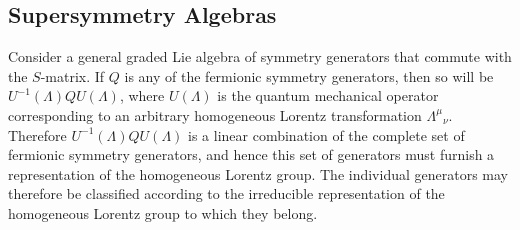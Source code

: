\subsection{Supersymmetry Algebras}

\newcommand{\WeylQ}{\mathrm{Q}}

Consider a general graded Lie algebra of symmetry generators that commute
with the \(S\)-matrix. If \(Q\) is any of the fermionic symmetry generators,
then so will be \(U^{-1}(\Lambda)QU(\Lambda)\), where \(U(\Lambda)\) is the
quantum mechanical operator corresponding to an arbitrary homogeneous
Lorentz transformation \(\Lambda^\mu{}_\nu\). Therefore
\(U^{-1}(\Lambda)QU(\Lambda)\) is a linear combination of the complete set
of fermionic symmetry generators, and hence this set of generators must
furnish a representation of the homogeneous Lorentz group. The individual
generators may therefore be classified according to the irreducible
representation of the homogeneous Lorentz group to which they belong.

